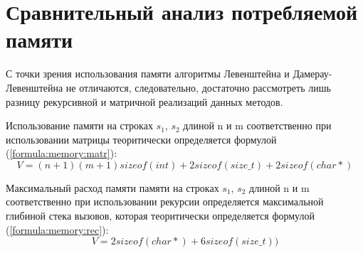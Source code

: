     \section{Сравнительный анализ потребляемой памяти}  
        С точки зрения использования памяти алгоритмы Левенштейна и
        Дамерау-Левенштейна не отличаются, следовательно, достаточно
        рассмотреть лишь разницу рекурсивной и матричной реализаций
        данных методов.
        
        Использование памяти на строках $s_1$, $s_2$ длиной n и m соответственно
        при использовании матрицы теоритически определяется формулой (\ref{formula:memory:matr}):
        \begin{equation}
            V = (n + 1)(m + 1)sizeof(int) + 2sizeof(size\_t) + 2sizeof(char*)
            \label{formula:memory:matr}
        \end{equation}
        

        Максимальный расход памяти памяти на строках $s_1$, $s_2$ длиной n и m соответственно
        при использовании рекурсии определяется максимальной глибиной стека вызовов,
        которая теоритически определяется формулой (\ref{formula:memory:rec}):
        \begin{equation}
            V = 2sizeof(char*) + 6sizeof(size\_t))
            \label{formula:memory:rec}
        \end{equation}
\newpage